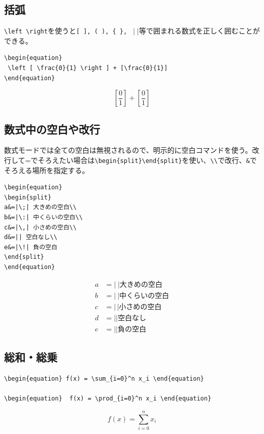 \documentclass[a4j]{jsarticle}
\begin{document}
\subsection{括弧}
\verb|\left \right|を使うと\verb|[ ], ( ), { }, | $|\;|$等で囲まれる数式を正しく囲むことができる。
\begin{verbatim}
\begin{equation}
 \left [ \frac{0}{1} \right ] + [\frac{0}{1}]
\end{equation}
\end{verbatim}
\begin{equation}\left [ \frac{0}{1} \right ] + [\frac{0}{1}]\end{equation}
\subsection{数式中の空白や改行}
数式モードでは全ての空白は無視されるので、明示的に空白コマンドを使う。改行して=でそろえたい場合は\verb|\begin{split}\end{split}|を使い、\verb|\\|で改行、\verb|&|でそろえる場所を指定する。
\begin{verbatim}
\begin{equation}
\begin{split}
a&=|\;| 大きめの空白\\
b&=|\:| 中くらいの空白\\
c&=|\,| 小さめの空白\\
d&=|| 空白なし\\
e&=|\!| 負の空白
\end{split}
\end{equation}
\end{verbatim}
\begin{equation}
\begin{split}
a&=|\;| 大きめの空白\\
b&=|\:| 中くらいの空白\\
c&=|\,| 小さめの空白\\
d&=|| 空白なし\\
e&=|\!| 負の空白
\end{split}
\end{equation}
\subsection{総和・総乗}
\begin{verbatim}
\begin{equation} f(x) = \sum_{i=0}^n x_i \end{equation}

\begin{equation}  f(x) = \prod_{i=0}^n x_i \end{equation}
\end{verbatim}
\begin{equation} f(x) = \sum_{i=0}^n x_i \end{equation}
\end{document}
